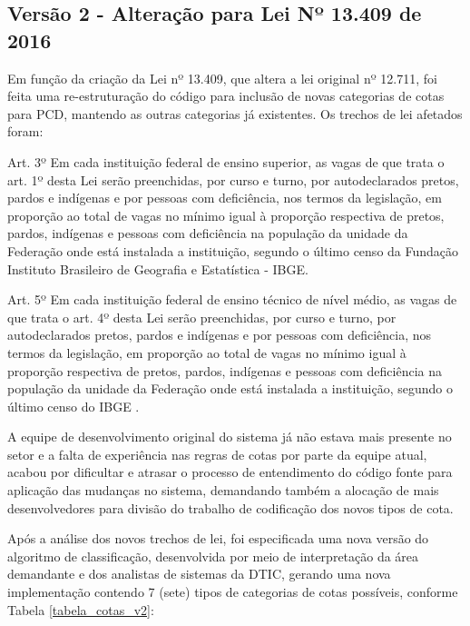 \subsection{Versão 2 - Alteração para Lei Nº 13.409 de 2016 }
\label{versao2}
 Em função da criação da Lei nº 13.409, que altera a lei original nº 12.711, foi feita uma re-estruturação do código para inclusão de novas categorias de cotas para \gls{PCD}, mantendo as outras categorias já existentes. Os trechos de lei afetados foram:
\begin{citacao}
Art. 3º Em cada instituição federal de ensino superior, as vagas de que trata o art. 1º desta Lei serão preenchidas, por curso e turno, por autodeclarados pretos, pardos e indígenas e por pessoas com deficiência, nos termos da legislação, em proporção ao total de vagas no mínimo igual à proporção respectiva de pretos, pardos, indígenas e pessoas com deficiência na população da unidade da Federação onde está instalada a instituição, segundo o último censo da Fundação Instituto Brasileiro de Geografia e Estatística - IBGE.

Art. 5º Em cada instituição federal de ensino técnico de nível médio, as vagas de que trata o art. 4º desta Lei serão preenchidas, por curso e turno, por autodeclarados pretos, pardos e indígenas e por pessoas com deficiência, nos termos da legislação, em proporção ao total de vagas no mínimo igual à proporção respectiva de pretos, pardos, indígenas e pessoas com deficiência na população da unidade da Federação onde está instalada a instituição, segundo o último censo do IBGE \cite{leicotas2}.
\end{citacao}

A equipe de desenvolvimento original do sistema já não estava mais presente no setor e a falta de experiência nas regras de cotas por parte da equipe atual, acabou por dificultar e atrasar o processo de entendimento do código fonte para aplicação das mudanças no sistema,  demandando também a alocação de mais desenvolvedores para divisão do trabalho de codificação dos novos tipos de cota.

Após a análise dos novos trechos de lei, foi especificada uma nova versão do algoritmo de classificação, desenvolvida por meio de interpretação da área demandante e dos analistas de sistemas da \gls{DTIC}, gerando uma nova implementação contendo 7 (sete) tipos de categorias de cotas possíveis, conforme Tabela \ref{tabela_cotas_v2}:



